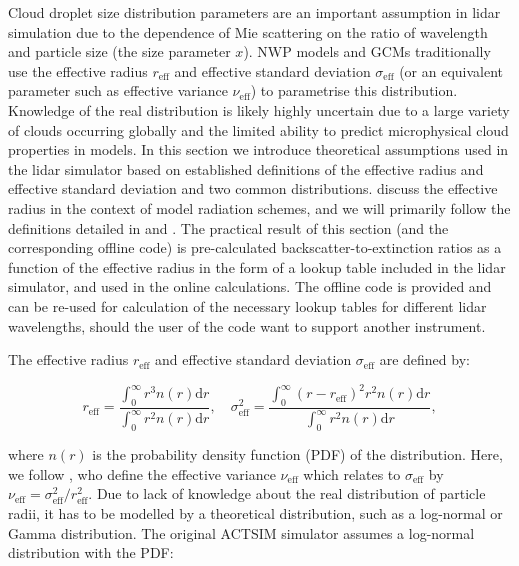 Cloud droplet size distribution parameters are an important assumption
in lidar simulation due to the dependence of Mie scattering on the ratio of
wavelength and particle size (the size parameter $x$). NWP models and GCMs
traditionally use the effective radius $r_\text{eff}$ and effective standard
deviation $\sigma_\text{eff}$ (or an equivalent parameter such as effective variance $\nu_\text{eff}$)
 to parametrise this distribution. Knowledge of the real distribution is likely highly
uncertain due to a large variety of clouds occurring globally and the limited
ability to predict microphysical cloud properties in models. In this section
we introduce theoretical assumptions used in the lidar simulator based on established
definitions of the effective radius and effective standard deviation and two
common distributions.
\cite{edwards1996} discuss the effective radius in the context of model radiation
schemes, and we will primarily follow the definitions detailed in \cite{chang2001} and
\cite{petty2011}. The practical result of this section (and the corresponding
offline code) is pre-calculated backscatter-to-extinction ratios as a function of
the effective radius in the form of a lookup table included in the lidar
simulator, and used in the online calculations. The offline code
is provided and can be re-used for calculation of the necessary lookup tables for
different lidar wavelengths, should the user of the code want to support another
instrument.

The effective radius $r_\text{eff}$ and effective standard deviation $\sigma_\text{eff}$
are defined by:

\begin{equation}
\label{eq:eff}
r_\text{eff} = \frac{\int_0^\infty r^3 n(r)\mathrm{d}r}{\int_0^\infty r^2 n(r)\mathrm{d}r}, \quad
\sigma_\text{eff}^2 = \frac{\int_0^\infty (r - r_\text{eff})^2 r^2 n(r) \mathrm{d}r}{\int_0^\infty r^2 n(r) \mathrm{d}r} ,
\end{equation}

\noindent
where $n(r)$ is the probability density function (PDF) of the distribution.
Here, we follow \cite{petty2011}, who define the effective variance
$\nu_\text{eff}$ which relates to $\sigma_\text{eff}$
by $\nu_\text{eff} = \sigma_\text{eff}^2 / r_\text{eff}^2$.
Due to lack of knowledge about the real distribution of particle radii, it has to be modelled by a
theoretical distribution, such as a log-normal or Gamma distribution.
The original ACTSIM simulator assumes a log-normal distribution \citep{chiriaco2006}
with the PDF:

